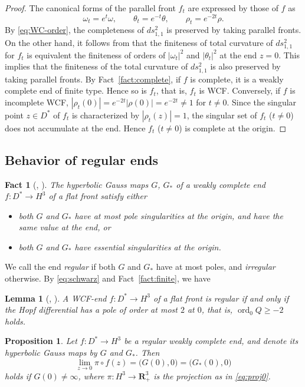 \documentclass[a4paper]{amsart}
\theoremstyle{plain}
\newtheorem{proposition}[theorem]{Proposition}
\newtheorem{lemma}[theorem]{Lemma}
\newtheorem{fact}[theorem]{Fact}
\theoremstyle{remark}
\numberwithin{equation}{section}
\begin{document}
\begin{proof}
 The canonical forms of the parallel front $f_t$ are 
 expressed by those of $f$ as
 \[
    \omega_t = e^{t}\omega,\qquad
    \theta_t = e^{-t}\theta,\qquad
    \rho_t = e^{-2t}\rho.
 \]
 By \eqref{eq:WC-order}, the completeness of $ds^2_{1,1}$
 is preserved by taking parallel fronts. 
 On the other hand, it follows from 
 \cite[(3.2)]{KRUY} that the finiteness of total curvature 
 of $ds^2_{1,1}$ for $f_t$ is equivalent the finiteness of orders of
 $|\omega_t|^2$ and $|\theta_t|^2$ at the end $z=0$.
 This implies that the finiteness of the total curvature of $ds^2_{1,1}$
 is also preserved by taking parallel fronts.
 By Fact~\ref{fact:complete}, if $f$ is complete, it is a weakly
 complete end of finite type.  
 Hence so is $f_t$, that is, $f_t$ is WCF.
 Conversely, if $f$ is incomplete WCF,
 $|\rho_t(0)|=e^{-2t}|\rho(0)|=e^{-2t}\neq 1$ for $t\neq 0$.
 Since the singular point $z\in D^*$ of $f_t$ is
 characterized by $|\rho_t(z)|=1$,
 the singular set of $f_t$ ($t\ne 0$) does not accumulate at the  end. 
 Hence $f_t$ ($t\ne 0$) is complete at the origin.
\end{proof}

\subsection*{Behavior of regular ends}

\begin{fact}[\cite{GMM}, \cite{KUY2}]\label{fact:regular}
 The hyperbolic Gauss maps 
 $G$, $G_*$ of a weakly complete  end $f\colon{}D^*\to H^3$
 of a flat front satisfy either
 \begin{itemize}
  \item both $G$ and $G_*$ have at most pole singularities 
        at the origin, and have the same value at the end, or
  \item both $G$ and $G_*$ have essential singularities at the origin.
 \end{itemize}
\end{fact}

We call the end {\em regular\/} if both $G$ and $G_*$ have at most
poles, and {\em irregular\/} otherwise.
By \eqref{eq:schwarz} and Fact~\ref{fact:finite},
we have
\begin{lemma}[\cite{GMM}, \cite{KUY2}]\label{lem:Q-regular}
 A WCF-end $f\colon{}D^*\to H^3$ of a flat front is regular if and only
 if the Hopf differential has a pole of order at most $2$ at $0$, 
that is, ${\operatorname{ord}}_0 Q\geq -2 $ holds.
\end{lemma}
\begin{proposition}\label{prop:end-limit}
 Let $f\colon{}D^*\to H^3$ be a regular weakly complete
 end, and denote its hyperbolic Gauss maps by $G$ and $G_*$.
 Then
 \[
     \lim_{z\to 0}\pi\circ f(z)=
            \bigl(G(0),0\bigr)=\bigl(G_*(0),0\bigr)
 \]
 holds if $G(0)\ne \infty$,
 where $\pi\colon{}H^3\to{\boldsymbol{R}}^3_+$ is the projection
 as in \eqref{eq:proj0}.  
\end{proposition}
\end{document}
